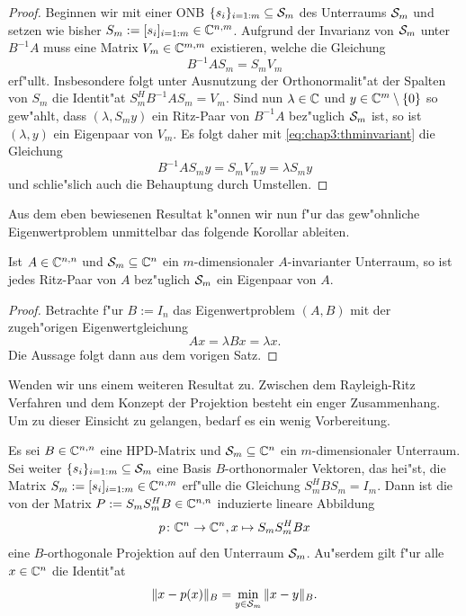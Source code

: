 \begin{proof}
Beginnen wir mit einer ONB $\{s_i\}_{i=1:m}\subseteq\S_m$ des Unterraums $\S_m$
und setzen wie bisher $S_m := [s_i]_{i=1:m}\in\C^{n,m}$. Aufgrund der Invarianz
von $\S_m$ unter $B^{-1}A$ muss eine Matrix $V_m \in \C^{m,m}$ existieren, welche
die Gleichung
\begin{equation}\label{eq:chap3:thminvariant}
B^{-1}A S_m = S_m V_m
\end{equation}
erf"ullt. Insbesondere folgt unter Ausnutzung der Orthonormalit"at der Spalten
von $S_m$ die Identit"at $S_m^H B^{-1}A S_m = V_m$.
Sind nun $\lambda\in\C$ und $y\in\C^m\setminus\{0\}$ so gew"ahlt, dass $(\lambda, S_m y)$
ein Ritz-Paar von $B^{-1}A$ bez"uglich $\S_m$ ist, so ist $(\lambda, y)$ ein Eigenpaar von $V_m$. Es folgt daher
mit \eqref{eq:chap3:thminvariant} die Gleichung
\[
B^{-1}AS_m y = S_m V_m y = \lambda S_m y
\]
und schlie"slich auch die Behauptung durch Umstellen.
\end{proof}

Aus dem eben bewiesenen Resultat k"onnen wir nun f"ur das gew"ohnliche Eigenwertproblem unmittelbar das folgende Korollar
ableiten.

\begin{kor}
Ist $A\in\Cnn$ und $\S_m\subseteq \Cn$ ein $m$-dimensionaler $A$-invarianter Unterraum, so ist
jedes Ritz-Paar von $A$ bez"uglich $\S_m$ ein Eigenpaar von $A$.
\end{kor}

\begin{proof}
Betrachte f"ur $B:=I_n$ das Eigenwertproblem $(A,B)$
mit der zugeh"origen Eigenwertgleichung
\[
Ax = \lambda Bx = \lambda x.
\]
Die Aussage folgt dann aus dem vorigen Satz.
\end{proof}

Wenden wir uns einem weiteren Resultat zu. Zwischen dem Rayleigh-Ritz Verfahren und dem Konzept der Projektion besteht ein enger Zusammenhang.
Um zu dieser Einsicht zu gelangen, bedarf es ein wenig
Vorbereitung.
\begin{thm}\label{thm:chap3:projektor}
Es sei $B\in\Cnn$ eine HPD-Matrix und $\S_m \subseteq \Cn$ ein $m$-dimensionaler Unterraum. Sei weiter $\{s_i\}_{i=1:m}\subseteq\S_m$ eine
Basis $B$-orthonormaler Vektoren, das hei"st, die Matrix $S_m := [s_i]_{i=1:m}
\in\C^{n,m}$ erf"ulle die Gleichung $S_m^H B S_m = I_m$. Dann ist die von der Matrix
 $P := S_m S_m^H B \in \Cnn$ induzierte lineare Abbildung
\[
p \colon \Cn \to \Cn, x\mapsto S_m S_m^H Bx
\]
eine $B$-orthogonale Projektion auf den Unterraum $\S_m$. Au"serdem gilt
f"ur alle $x\in\Cn$ die Identit"at
\[
\|x-p(x)\|_B = \min_{y\in\S_m} \|x - y\|_B.
\]
\end{thm}

